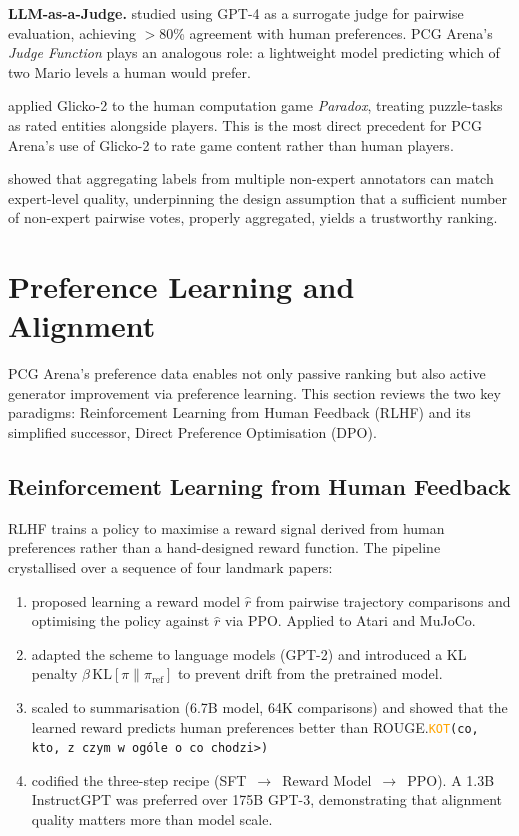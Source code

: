 \documentclass[shortabstract, mgr, english]{iithesis}
\newcommand{\DEBUG}[1]{{#1}} %
\newcommand{\KOT}[1]{\DEBUG{\tt{\textcolor{orange}{KOT}(}{#1}{)}}}
\begin{document}
\textbf{LLM-as-a-Judge.} \citet{zheng2023judging} studied using GPT-4 as a
surrogate judge for pairwise evaluation, achieving $>$80\% agreement with human
preferences. PCG Arena's \emph{Judge Function} plays an analogous role: a
lightweight model predicting which of two Mario levels a human would prefer.

\citet{sarkar2017glicko2} applied Glicko-2 to the human computation game
\emph{Paradox}, treating puzzle-tasks as rated entities alongside players.
This is the most direct precedent for PCG Arena's use of Glicko-2 to rate
game content rather than human players.

\citet{snow2008cheap} showed that aggregating labels from multiple non-expert
annotators can match expert-level quality, underpinning the design assumption
that a sufficient number of non-expert pairwise votes, properly aggregated,
yields a trustworthy ranking.


\section{Preference Learning and Alignment}
\label{sec:bg-alignment}

PCG Arena's preference data enables not only passive ranking but also active
generator improvement via preference learning. This section reviews the two key
paradigms: Reinforcement Learning from Human Feedback (RLHF) and its simplified
successor, Direct Preference Optimisation (DPO).

\subsection{Reinforcement Learning from Human Feedback}
\label{subsec:bg-rlhf}

RLHF trains a policy to maximise a reward signal derived from human preferences
rather than a hand-designed reward function. The pipeline crystallised over a
sequence of four landmark papers:

\begin{enumerate}[nosep]
    \item \citet{christiano2017deep} proposed learning a reward model $\hat{r}$
    from pairwise trajectory comparisons and optimising the policy against
    $\hat{r}$ via PPO. Applied to Atari and MuJoCo.
    \item \citet{ziegler2019fine} adapted the scheme to language models (GPT-2)
    and introduced a KL penalty
    $\beta\,\mathrm{KL}[\pi \| \pi_{\mathrm{ref}}]$ to prevent drift from
    the pretrained model.
    \item \citet{stiennon2020learning} scaled to summarisation (6.7B model, 64K
    comparisons) and showed that the learned reward predicts human preferences
    better than ROUGE.\KOT{co, kto, z czym w ogóle o co chodzi>}
    \item \citet{ouyang2022training} codified the three-step recipe
    (SFT~$\to$~Reward Model~$\to$~PPO). A 1.3B InstructGPT was preferred over
    175B GPT-3, demonstrating that alignment quality matters more than model
    scale.
\end{enumerate}
\end{document}
